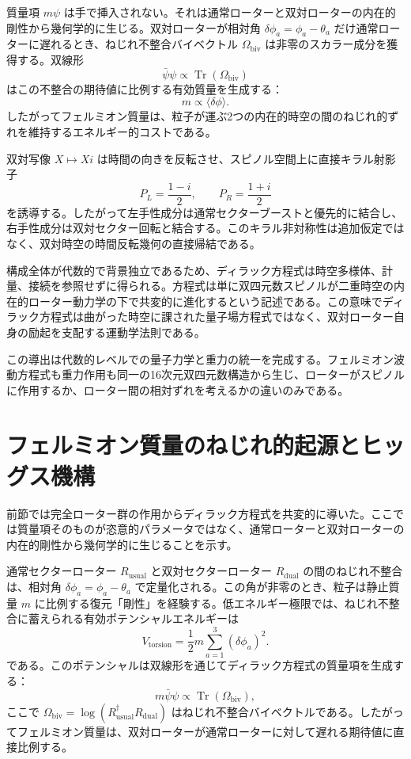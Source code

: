 \documentclass[a4paper]{article}
\begin{document}
質量項 $m\psi$ は手で挿入されない。それは通常ローターと双対ローターの内在的剛性から幾何学的に生じる。双対ローターが相対角 $\delta\phi_a = \phi_a - \theta_a$ だけ通常ローターに遅れるとき、ねじれ不整合バイベクトル $\Omega_\text{biv}$ は非零のスカラー成分を獲得する。双線形
\[
\bar{\psi}\psi \propto \operatorname{Tr}(\Omega_\text{biv})
\]
はこの不整合の期待値に比例する有効質量を生成する：
\[
m \propto \langle \delta\phi \rangle.
\]
したがってフェルミオン質量は、粒子が運ぶ2つの内在的時空の間のねじれ的ずれを維持するエネルギー的コストである。

双対写像 $X \mapsto X i$ は時間の向きを反転させ、スピノル空間上に直接キラル射影子
\[
P_L = \frac{1-i}{2}, \qquad P_R = \frac{1+i}{2}
\]
を誘導する。したがって左手性成分は通常セクターブーストと優先的に結合し、右手性成分は双対セクター回転と結合する。このキラル非対称性は追加仮定ではなく、双対時空の時間反転幾何の直接帰結である。

構成全体が代数的で背景独立であるため、ディラック方程式は時空多様体、計量、接続を参照せずに得られる。方程式は単に双四元数スピノルが二重時空の内在的ローター動力学の下で共変的に進化するという記述である。この意味でディラック方程式は曲がった時空に課された量子場方程式ではなく、双対ローター自身の励起を支配する運動学法則である。

この導出は代数的レベルでの量子力学と重力の統一を完成する。フェルミオン波動方程式も重力作用も同一の16次元双四元数構造から生じ、ローターがスピノルに作用するか、ローター間の相対ずれを考えるかの違いのみである。

\section{フェルミオン質量のねじれ的起源とヒッグス機構}
\label{sec:mass}

前節では完全ローター群の作用からディラック方程式を共変的に導いた。ここでは質量項そのものが恣意的パラメータではなく、通常ローターと双対ローターの内在的剛性から幾何学的に生じることを示す。

通常セクターローター $R_\text{usual}$ と双対セクターローター $R_\text{dual}$ の間のねじれ不整合は、相対角 $\delta\phi_a = \phi_a - \theta_a$ で定量化される。この角が非零のとき、粒子は静止質量 $m$ に比例する復元「剛性」を経験する。低エネルギー極限では、ねじれ不整合に蓄えられる有効ポテンシャルエネルギーは
\[
V_\text{torsion} = \frac{1}{2} m \sum_{a=1}^3 (\delta\phi_a)^2.
\]
である。このポテンシャルは双線形を通じてディラック方程式の質量項を生成する：
\[
m \bar{\psi}\psi \propto \operatorname{Tr}(\Omega_\text{biv}),
\]
ここで $\Omega_\text{biv} = \log(R_\text{usual}^\dagger R_\text{dual})$ はねじれ不整合バイベクトルである。したがってフェルミオン質量は、双対ローターが通常ローターに対して遅れる期待値に直接比例する。
\end{document}
